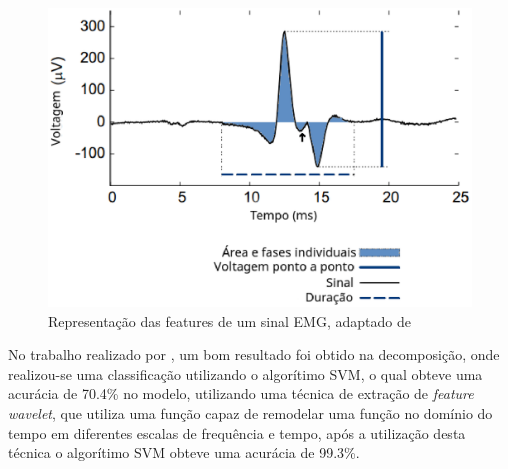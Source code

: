 \begin{figure}[!htb]
    \centering
     \includegraphics[width=1\textwidth]{figuras/featuresEMG.eps}
     \caption{Representação das features de um sinal EMG, adaptado de }
     \label{featuresEMG}
 \end{figure}
 

No trabalho realizado por , um bom resultado foi obtido na decomposição, onde realizou-se uma classificação utilizando o algorítimo SVM, o qual obteve uma acurácia de 70.4\% no modelo, utilizando uma técnica de extração de \textit{feature} \textit{wavelet}, que utiliza uma função capaz de remodelar uma função no domínio do tempo em diferentes escalas de frequência e tempo, após a utilização desta técnica o algorítimo SVM obteve uma acurácia de 99.3\%.

